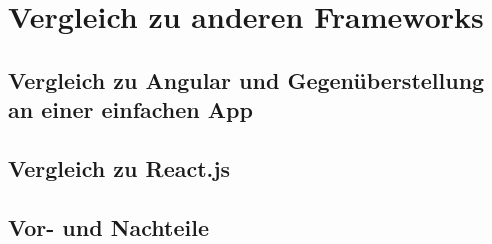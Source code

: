 
\chapter{Vergleich zu anderen Frameworks}

\section{Vergleich zu Angular und Gegenüberstellung an einer einfachen App}

\section{Vergleich zu React.js}

\section{Vor- und Nachteile}